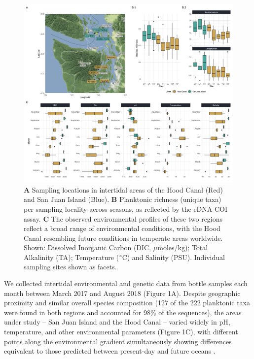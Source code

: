 \documentclass[11pt]{article}
\begin{document}
\begin{linenumbers}
\begin{figure}%
\centering
\includegraphics[width=1 \linewidth]{Figures_for_MS/Fig1.png}
\caption{\footnotesize {\textbf{A} Sampling locations in intertidal areas of the Hood Canal (Red) and San Juan Island (Blue). \textbf{B} Planktonic richness (unique taxa) per sampling locality across seasons, as reflected by the eDNA COI assay. \textbf{C} The observed environmental profiles of these two regions reflect a broad range of environmental conditions, with the Hood Canal resembling future conditions in temperate areas worldwide. Shown: Dissolved Inorganic Carbon (DIC, $\mu$moles/kg); Total Alkalinity (TA); Temperature ($\degree$C) and Salinity (PSU). Individual sampling sites shown as facets.}}
\label{fig:Fig1}
\end{figure}


We collected intertidal environmental and genetic data from bottle samples each month between March 2017 and August 2018 (Figure 1A). Despite geographic proximity and similar overall species composition (127 of the 222 planktonic taxa were found in both regions and accounted for 98\% of the sequences), the areas under study -- San Juan Island and the Hood Canal -- varied widely in pH, temperature, and other environmental parameters (Figure 1C), with different points along the environmental gradient simultaneously showing differences equivalent to those predicted between present-day and future oceans \cite{bopp2013multiple}.



\end{linenumbers}
\end{document}
